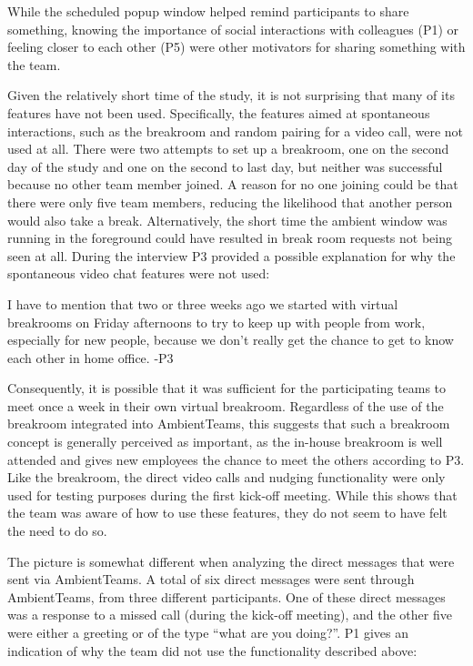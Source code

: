 While the scheduled popup window helped remind participants to share something, knowing the importance of social interactions with colleagues (P1) or feeling closer to each other (P5) were other motivators for sharing something with the team.

Given the relatively short time of the study, it is not surprising that many of its features have not been used. Specifically, the features aimed at spontaneous interactions, such as the breakroom and random pairing for a video call, were not used at all. There were two attempts to set up a breakroom, one on the second day of the study and one on the second to last day, but neither was successful because no other team member joined. A reason for no one joining could be that there were only five team members, reducing the likelihood that another person would also take a break. Alternatively, the short time the ambient window was running in the foreground could have resulted in break room requests not being seen at all. During the interview P3 provided a possible explanation for why the spontaneous video chat features were not used:

\begin{displayquote}[][]
    [...] I have to mention that two or three weeks ago we started with virtual breakrooms on Friday afternoons to try to keep up with people from work, especially for new people, because we don't really get the chance to get to know each other in home office. -P3
\end{displayquote}

Consequently, it is possible that it was sufficient for the participating teams to meet once a week in their own virtual breakroom. Regardless of the use of the breakroom integrated into AmbientTeams, this suggests that such a breakroom concept is generally perceived as important, as the in-house breakroom is well attended and gives new employees the chance to meet the others according to P3. Like the breakroom, the direct video calls and nudging functionality were only used for testing purposes during the first kick-off meeting. While this shows that the team was aware of how to use these features, they do not seem to have felt the need to do so. 

The picture is somewhat different when analyzing the direct messages that were sent via AmbientTeams. A total of six direct messages were sent through AmbientTeams, from three different participants. One of these direct messages was a response to a missed call (during the kick-off meeting), and the other five were either a greeting or of the type \enquote{what are you doing?}. P1 gives an indication of why the team did not use the functionality described above:

